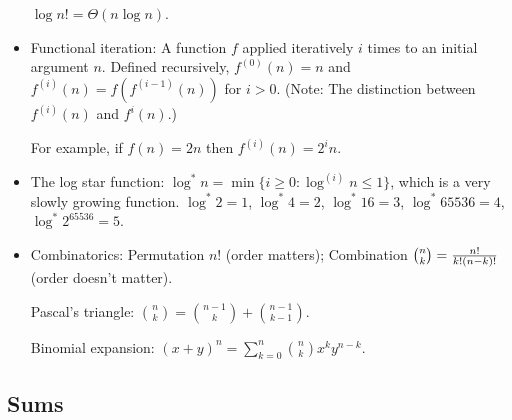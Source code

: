 \documentclass{article}
\begin{document}
\begin{itemize}
$\log n!=\Theta(n\log n)$.

\item Functional iteration: A function $f$ applied iteratively $i$ times
to an initial argument $n$. Defined recursively, $f^{(0)}(n)=n$ and
$f^{(i)}(n)=f(f^{(i-1)}(n))$ for $i>0$. (Note: The distinction between
$f^{(i)}(n)$ and $f^i(n)$.)

For example, if $f(n)=2n$ then $f^{(i)}(n)=2^in$.

\item The log star function: $\log^* n=\min\{i\ge0:\log^{(i)}n\le1\}$,
which is a very slowly growing function. $\log^*2=1$, $\log^* 4=2$,
$\log^*16=3$, $\log^*65536=4$, $\log^*2^{65536}=5$.

\item Combinatorics: Permutation $n!$ (order matters);
Combination ${n\choose k}={n!\over {k!(n-k)!}}$ (order doesn't matter).

Pascal's triangle: ${n\choose k}={{n-1}\choose k}+{{n-1}\choose {k-1}}$.

Binomial expansion: $(x+y)^n=\sum_{k=0}^n {n\choose k}x^ky^{n-k}$.

\end{itemize}

\subsection{Sums}

\end{document}
